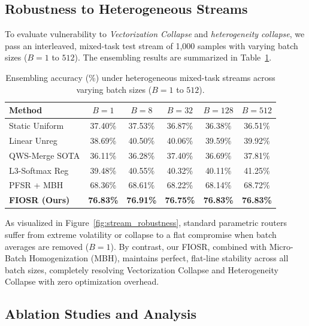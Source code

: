 \subsection{Robustness to Heterogeneous Streams}
To evaluate vulnerability to \emph{Vectorization Collapse} and \emph{heterogeneity collapse}, we pass an interleaved, mixed-task test stream of 1,000 samples with varying batch sizes ($B=1$ to $512$). The ensembling results are summarized in Table~\ref{tab:hetero_results}.

\begin{table}[t]
\caption{Ensembling accuracy (\%) under heterogeneous mixed-task streams across varying batch sizes ($B=1$ to $512$).}
\label{tab:hetero_results}
\begin{center}
\begin{small}
\begin{sc}
\begin{tabular} {lccccc}
\toprule
Method & $B=1$ & $B=8$ & $B=32$ & $B=128$ & $B=512$ \\
\midrule
Static Uniform & 37.40\% & 37.53\% & 36.87\% & 36.38\% & 36.51\% \\
Linear Unreg & 38.69\% & 40.50\% & 40.06\% & 39.59\% & 39.92\% \\
QWS-Merge SOTA & 36.11\% & 36.28\% & 37.40\% & 36.69\% & 37.81\% \\
L3-Softmax Reg & 39.48\% & 40.55\% & 40.32\% & 40.11\% & 41.25\% \\
PFSR + MBH & 68.36\% & 68.61\% & 68.22\% & 68.14\% & 68.72\% \\
\textbf{FIOSR (Ours)} & \textbf{76.83\%} & \textbf{76.91\%} & \textbf{76.75\%} & \textbf{76.83\%} & \textbf{76.83\%} \\
\bottomrule
\end{tabular}
\end{sc}
\end{small}
\end{center}
\end{table}

As visualized in Figure~\ref{fig:stream_robustness}, standard parametric routers suffer from extreme volatility or collapse to a flat compromise when batch averages are removed ($B=1$). By contrast, our FIOSR, combined with Micro-Batch Homogenization (MBH), maintains perfect, flat-line stability across all batch sizes, completely resolving Vectorization Collapse and Heterogeneity Collapse with zero optimization overhead.

\subsection{Ablation Studies and Analysis}

